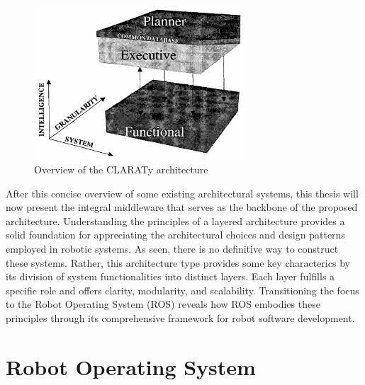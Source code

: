 \documentclass[%
paper=A4,               %
twoside=true,           %
openright,              %
11pt,                   %
bibliography=totoc,     %
titlepage=on,           %
DIV=12,                 %
BCOR=1.5cm,             %
parskip=half,            %
final
]{scrreprt}
\begin{document}
	
	\begin{figure}[ht]
		\centering
		\includegraphics[width=0.7\textwidth]{Graphics/CLARATy}
		\caption{Overview of the CLARATy architecture \autocite{volpeCLARAtyArchitectureRobotic2001} }
		\label{fig: fig4}
	\end{figure} 
	
	
	
	After this concise overview of some existing architectural systems, this thesis will now present the integral middleware that serves as the backbone of the proposed architecture.
	Understanding the principles of a layered architecture provides a solid foundation for appreciating the architectural choices and design patterns employed in robotic systems. As seen, there is no definitive way to construct these systems. Rather, this architecture type provides some key characterics by its division of system functionalities into distinct layers. Each layer fulfills a specific role and offers clarity, modularity, and scalability. Transitioning the focus to the Robot Operating System (ROS) reveals how ROS embodies these principles through its comprehensive framework for robot software development.
	
	
	
	\section{Robot Operating System}
\end{document}
